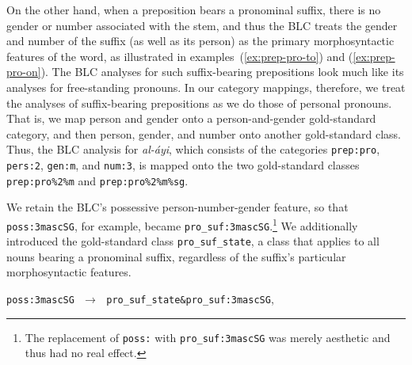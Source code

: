 {\begin{description}
On the other hand, when a preposition bears a pronominal suffix, there is no gender 
or number associated with the stem, and thus the BLC treats the gender and 
number of the suffix (as well as its person) 
as the primary morphosyntactic features of the word, as illustrated in 
examples~(\ref{ex:prep-pro-to}) 
and (\ref{ex:prep-pro-on}). The BLC analyses for such suffix-bearing 
prepositions look much 
like its analyses for free-standing pronouns. 
In our category mappings, therefore, we treat the analyses of suffix-bearing 
prepositions as we do those 
of personal pronouns. That is, we map person and gender onto a person-and-gender gold-standard
category, and then person, gender, and number onto another gold-standard class.
Thus, the BLC analysis for \textit{al-\'{a}yi}, 
which consists of the categories \texttt{prep:pro}, \texttt{pers:2}, \texttt{gen:m}, and \texttt{num:3}, 
is mapped onto the two gold-standard classes \texttt{prep:pro\%2\%m} and 
\texttt{prep:pro\%2\%m\%sg}.

We retain the BLC's possessive person-number-gender feature, so that \texttt{poss:3mascSG},
for example, became \texttt{pro\_suf:3mascSG}.\footnote{The replacement of \texttt{poss:} with 
\texttt{pro\_suf:3mascSG} was merely aesthetic and thus had no real effect.}
We additionally introduced the gold-standard class \texttt{pro\_suf\_state}, a class that applies to
all nouns bearing a pronominal suffix, regardless of the suffix's particular
morphosyntactic features. 
\begin{exe}
\ex \label{ex:mapping-pron-suf}
\texttt{poss:3mascSG}  $\,\,\to\,\,$ \texttt{pro\_suf\_state\&pro\_suf:3mascSG}, 
\end{exe}

%
%




\end{description}}
